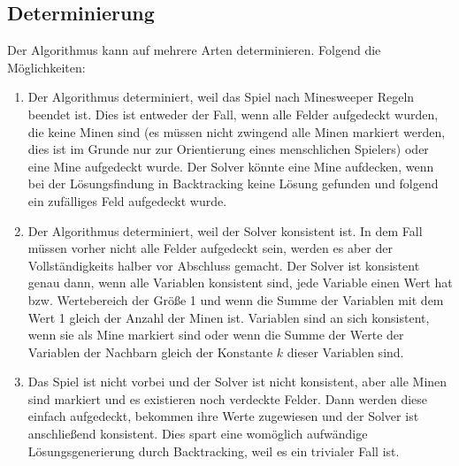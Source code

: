 \subsection{Determinierung}

Der Algorithmus kann auf mehrere Arten determinieren. Folgend die Möglichkeiten:
\begin{enumerate}
    \item Der Algorithmus determiniert, weil das Spiel nach Minesweeper Regeln beendet ist. Dies ist entweder der Fall, wenn alle Felder aufgedeckt
    wurden, die keine Minen sind (es müssen nicht zwingend alle Minen markiert werden, dies ist im Grunde nur zur Orientierung eines menschlichen
    Spielers) oder eine Mine aufgedeckt wurde. Der Solver könnte eine Mine aufdecken, wenn bei der Lösungsfindung in Backtracking keine Lösung
    gefunden und folgend ein zufälliges Feld aufgedeckt wurde.
    \item Der Algorithmus determiniert, weil der Solver konsistent ist. In dem Fall müssen vorher nicht alle Felder aufgedeckt sein, werden
    es aber der Vollständigkeits halber vor Abschluss gemacht. Der Solver ist konsistent genau dann, wenn alle Variablen konsistent sind, 
    jede Variable einen Wert hat bzw. Wertebereich der Größe 1 und wenn die Summe der Variablen mit dem Wert 1 gleich der Anzahl der Minen ist.
    Variablen sind an sich konsistent, wenn sie als Mine markiert sind oder wenn die Summe der Werte der Variablen der Nachbarn gleich der
    Konstante $k$ dieser Variablen sind.
    \item Das Spiel ist nicht vorbei und der Solver ist nicht konsistent, aber alle Minen sind markiert und es existieren noch verdeckte Felder.
    Dann werden diese einfach aufgedeckt, bekommen ihre Werte zugewiesen und der Solver ist anschließend konsistent. Dies spart eine womöglich
    aufwändige Lösungsgenerierung durch Backtracking, weil es ein trivialer Fall ist.
\end{enumerate}
